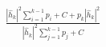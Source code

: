 \documentclass[preview]{standalone}
\begin{document}
\begin{align*}
\frac{\left|{\hat{h}_k}\right|^2\sum_{i=1}^{k-1}p_i+ C + p_k\left|{\hat{h}_k}\right|^2}{\left|{\hat{h}_k}\right|^2\sum_{j=1}^{k-1}p_j+ C}
\end{align*}
\end{document}
